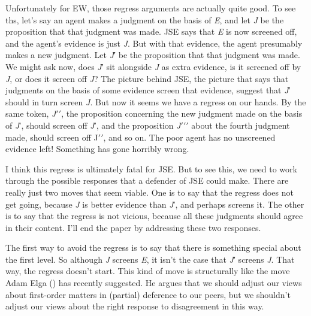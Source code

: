 \documentclass[
  10pt,
  letterpaper,
  DIV=11,
  numbers=noendperiod,
  twoside]{scrartcl}
\begin{document}
Unfortunately for EW, those regress arguments are actually quite good.
To see ths, let's say an agent makes a judgment on the basis of
\emph{E}, and let \emph{J} be the proposition that that judgment was
made. JSE says that \emph{E} is now screened off, and the agent's
evidence is just \emph{J}. But with that evidence, the agent presumably
makes a new judgment. Let \emph{J}′ be the proposition that that
judgment was made. We might ask now, does \emph{J}′ sit alongside
\emph{J} as extra evidence, is it screened off by \emph{J}, or does it
screen off \emph{J}? The picture behind JSE, the picture that says that
judgments on the basis of some evidence screen that evidence, suggest
that \emph{J}′ should in turn screen \emph{J}. But now it seems we have
a regress on our hands. By the same token, \emph{J}\(\prime \prime\),
the proposition concerning the new judgment made on the basis of
\emph{J}′, should screen off \emph{J}′, and the proposition
\emph{J}\(\prime \prime \prime\) about the fourth judgment made, should
screen off J\(\prime \prime\), and so on. The poor agent has no
unscreened evidence left! Something has gone horribly wrong.

I think this regress is ultimately fatal for JSE. But to see this, we
need to work through the possible responses that a defender of JSE could
make. There are really just two moves that seem viable. One is to say
that the regress does not get going, because \emph{J} is better evidence
than \emph{J}′, and perhaps screens it. The other is to say that the
regress is not vicious, because all these judgments should agree in
their content. I'll end the paper by addressing these two responses.

The first way to avoid the regress is to say that there is something
special about the first level. So although \emph{J} screens \emph{E}, it
isn't the case that \emph{J}′ screens \emph{J}. That way, the regress
doesn't start. This kind of move is structurally like the move Adam Elga
() has recently suggested. He argues
that we should adjust our views about first-order matters in (partial)
deference to our peers, but we shouldn't adjust our views about the
right response to disagreement in this way.
\end{document}
